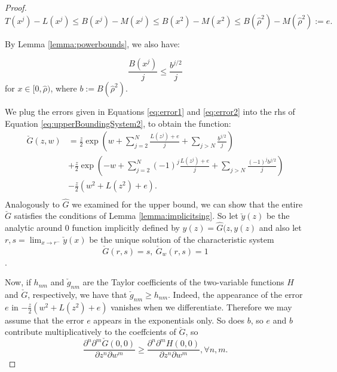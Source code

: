 \documentclass[10pt,a4paper]{amsart}
\newcommand{\LG}{\check{G}}
\newcommand{\nicetrees}{T}
\begin{document}
\begin{proof}
\begin{equation}\label{eq:error1}
	\nicetrees(x^j) - L(x^j) \leq B(x^j) - M(x^j)  \leq B(x^2) - M(x^2) \leq B(\hat{\rho}^2) -M(\hat{\rho}^2) :=e.
	\end{equation}

 By Lemma \ref{lemma:powerbounds},  we also have:

\begin{equation}\label{eq:error2}
     \frac{B(x^j)}{j} \leq  \frac{b^{j/2}}{j}
   \end{equation}
for $x \in [0,\hat{\rho})$, where $b := B(\hat{\rho}^2)$. 


We plug the errors given in  Equations \eqref{eq:error1} and \eqref{eq:error2} into the rhs of Equation \eqref{eq:upperBoundingSystem2}, to obtain the function:
\begin{equation}\label{eq:Gcheck}
\begin{split}
    \LG(z,w) &=  \frac{z}{2} 
        \exp\left( w + \sum\limits_{j = 2}^{N} \frac{L(z^j) +e}{j}
        + \sum\limits_{j > N} \frac{b^{j/2}}{j} \right)  \\ 
      &+\frac{z}{2}\exp\left(-w + \sum\limits_{j = 2}^{N} (-1)^j \frac{L(z^j) +e}{j} 
      + \sum\limits_{j > N} \frac{(-1)^j b^{j/2}}{j} \right) \\
      &-\frac{z}{2}\left(w^2 + L(z^2) +e\right).\\  
    \end{split}
 \end{equation} 
 Analogously to $\hat{G}$ we examined for the upper bound, we can show that the  entire $\check{G}$  satisfies  the conditions of Lemma \ref{lemma:implicitsing}. So let $\check{y}(z)$ be the analytic around 0 function implicitly defined by  $y(z) = \hat{G}(z, y(z)$ and also let $r,s = \lim_{x\rightarrow r^{-}}\check{y}(x)$ be the unique solution of the characteristic system $$\check{G}(r,s)=s, \ \check{G}_w(r,s) =1$$. 
 
 
 
 Now, if $h_{nm}$ and $\check{g}_{nm}$  are the Taylor coefficients of the two-variable functions 
  $H$ and   $\check{G}$, respectively, 
 we have that $\check{g}_{nm} \geq   h_{nm} $. Indeed, the appearance of  the error $e$ in $-\frac{z}{2}\left(w^2 + L(z^2) +e\right)$ vanishes when we differentiate. Therefore we may assume that the error $e$ appears in the exponentials only. So does $b$,  so $e$ and $b$  contribute multiplicatively to the coeffcients of $\check{G}$, so  $$\frac{\partial^n \partial^m \check{G}(0,0)}{\partial z^n \partial w^m} \geq \frac{\partial^n \partial^m H(0,0)}{\partial z^n \partial w^m}, \forall n, m.   $$
   

\end{proof}
\end{document}
